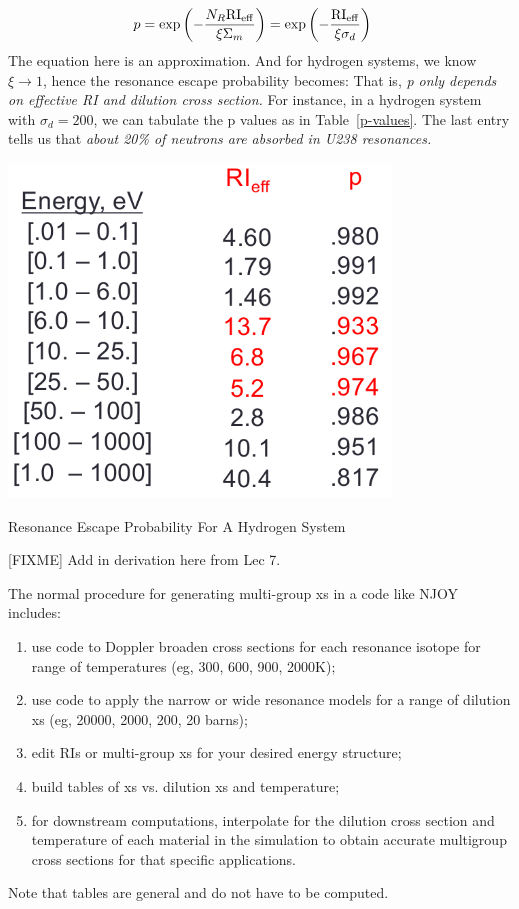 \documentclass{school-22.211-notes}
\begin{document}
\begin{align}
p &= \exp \left( - \frac{N_R \mathrm{RI}_{\mathrm{eff}}}{\xi \Sigma_m} \right)  = \exp \left( - \frac{\mathrm{RI}_{\mathrm{eff}}}{\xi \sigma_d} \right)
\end{align}
The equation here is an approximation. And for hydrogen systems, we know $\xi \to 1$, hence the resonance escape probability becomes:
That is, \textit{p only depends on effective RI and dilution cross section.} For instance, in a hydrogen system with $\sigma_d = 200$, we can tabulate the p values as in Table~\ref{p-values}. The last entry tells us that \textit{about 20\% of neutrons are absorbed in U238 resonances.}
\begin{table}
  \centering
  \includegraphics[width=4in]{images/resonance-escape-probability.png}
  \caption{Resonance Escape Probability For A Hydrogen System} \label{p-values}
\end{table}

[FIXME] Add in derivation here from Lec 7. 



The normal procedure for generating multi-group xs in a code like NJOY includes:
\begin{enumerate}
\item use code to Doppler broaden cross sections for each resonance isotope for range of temperatures (eg, 300, 600, 900, 2000K); 
\item use code to apply the narrow or wide resonance models for a range of dilution xs (eg, 20000, 2000, 200, 20 barns); 
\item edit RIs or multi-group xs for your desired energy structure; 
\item build tables of xs vs. dilution xs and temperature;
\item for downstream computations, interpolate for the dilution cross section and temperature of each material in the simulation to obtain accurate multigroup cross sections for that specific applications. 
\end{enumerate}
Note that tables are general and do not have to be computed. 
\end{document}
